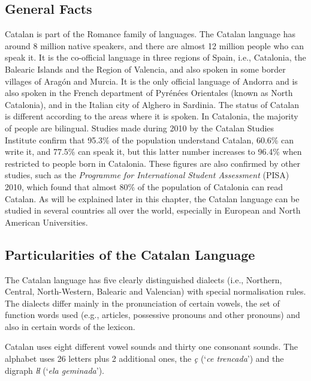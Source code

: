 \documentclass[]{../../metanetpaper}
\begin{document}
\begin{multicols}{2}

\subsection{General Facts}

    Catalan is part of the Romance family of languages. The Catalan language has around 8 million native speakers, and there are almost 12 million people who can speak it. It is the co-official language in three regions of Spain, i.e., Catalonia, the Balearic Islands and the Region of Valencia, and also spoken in some border villages of Aragón and Murcia.  It is the only official language of Andorra and is also spoken in the French department of Pyrénées Orientales (known as North Catalonia), and in the Italian city of Alghero in Sardinia.
The status of Catalan is different according to the areas where it is spoken. In Catalonia, the majority of people are bilingual. Studies made during 2010 by the Catalan Studies Institute confirm that 95.3\% of the population understand Catalan, 60.6\% can write it, and 77.5\% can speak it, but this latter number increases to 96.4\% when restricted to people born in Catalonia. These figures are also confirmed by other studies, such as the \textit{Programme for International Student Assessment} (PISA)  2010, which found that almost 80\% of the population of Catalonia can read Catalan. 
As will be explained later in this chapter, the Catalan language can be studied in several countries all over the world, especially in European and North American Universities.

\subsection{Particularities of the Catalan Language}

The Catalan language has five clearly distinguished dialects (i.e., Northern, Central, North-Western, Balearic and Valencian) with special normalisation rules. The dialects differ mainly in the pronunciation of certain vowels, the set of function words used (e.g., articles, possessive pronouns and other pronouns) and also in certain words of the lexicon. 

Catalan uses eight different vowel sounds and thirty one consonant sounds. The alphabet uses 26 letters plus 2 additional ones, the \textit{ç} (‘\textit{ce trencada}’) and the digraph \textit{ŀl} (‘\textit{ela geminada}’).


\end{multicols}
\end{document}
